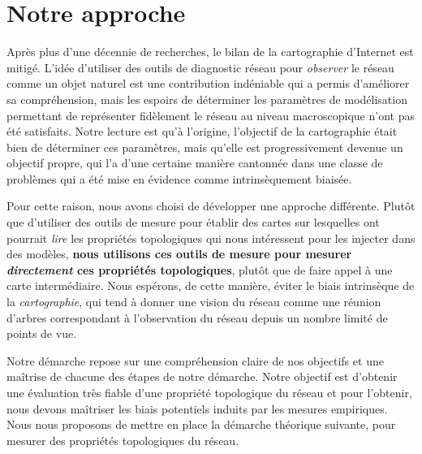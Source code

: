 \section{Notre approche}
\label{subsec:intro-POM}

Après plus d'une décennie de recherches, le bilan de la cartographie d'Internet
est mitigé. L'idée d'utiliser des outils de diagnostic réseau pour {\em
observer} le réseau comme un objet naturel est une contribution indéniable qui a
permis d'améliorer sa compréhension, mais les espoirs de déterminer les
paramètres de modélisation permettant de représenter fidèlement le réseau au
niveau macroscopique n'ont pas été satisfaits. Notre lecture est qu'à l'origine,
l'objectif de la cartographie était bien de déterminer ces paramètres, mais
qu'elle est progressivement devenue un objectif propre, qui l'a d'une certaine
manière cantonnée dans une classe de problèmes qui a été mise en évidence comme
intrinsèquement biaisée.

Pour cette raison, nous avons choisi de développer une approche différente.
Plutôt que d'utiliser des outils de mesure pour établir des cartes sur
lesquelles ont pourrait {\em lire} les propriétés topologiques qui nous
intéressent pour les injecter dans des modèles, {\bf nous utilisons ces outils
de mesure pour mesurer {\em directement} ces propriétés topologiques}, plutôt
que de faire appel à une carte intermédiaire.
Nous espérons, de cette manière, éviter le biais intrinsèque de la {\em
cartographie}, qui tend à donner une vision du réseau comme une réunion d'arbres
correspondant à l'observation du réseau depuis un nombre limité de points de
vue.

Notre démarche repose sur une compréhension claire de nos objectifs et une
maîtrise de chacune des étapes de notre démarche. Notre objectif est
d'obtenir une évaluation très fiable d'une propriété topologique du réseau et
pour l'obtenir, nous devons maîtriser les biais potentiels induits par les
mesures empiriques. Nous nous proposons de mettre en place la démarche théorique
suivante, pour mesurer des propriétés topologiques du réseau.

